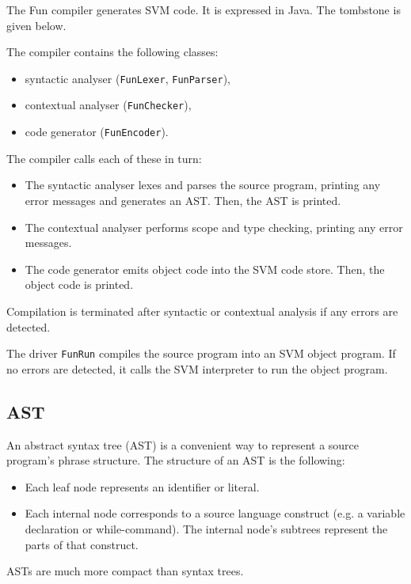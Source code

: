 \documentclass[a4paper, openany]{memoir}
\begin{document}
The Fun compiler generates SVM code. It is expressed in Java. The tombstone is given below.
\begin{figure}[H]
    \centering
\end{figure}
\noindent The compiler contains the following classes:
\begin{itemize}
    \item syntactic analyser (\texttt{FunLexer}, \texttt{FunParser}),
    \item contextual analyser (\texttt{FunChecker}),
    \item code generator (\texttt{FunEncoder}).
\end{itemize}
The compiler calls each of these in turn:
\begin{itemize}
    \item The syntactic analyser lexes and parses the source program, printing any error messages and generates an AST. Then, the AST is printed.
    \item The contextual analyser performs scope and type checking, printing any error messages.
    \item The code generator emits object code into the SVM code store. Then, the object code is printed.
\end{itemize}
Compilation is terminated after syntactic or contextual analysis if any errors are detected.

The driver \texttt{FunRun} compiles the source program into an SVM object program. If no errors are detected, it calls the SVM interpreter to run the object program.

\subsection{AST}
An abstract syntax tree (AST) is a convenient way to represent a source program's phrase structure. The structure of an AST is the following:
\begin{itemize}
    \item Each leaf node represents an identifier or literal.
    \item Each internal node corresponds to a source language construct (e.g. a variable declaration or while-command). The internal node's subtrees represent the parts of that construct.
\end{itemize}
ASTs are much more compact than syntax trees.
\end{document}

